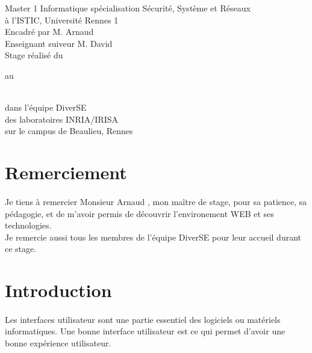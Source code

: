 \documentclass[11pt, a4paper, pdftex]{article}
\begin{document}
    \maketitle
    \thispagestyle{pagedegarde}
    \begin{center}
        \vspace{0.25cm} Master 1 Informatique spécialisation Sécurité, Système et Réseaux \\ à l'ISTIC, Université Rennes 1 \\
        \vspace{0.25cm} Encadré par M. Arnaud  \\
        \vspace{0.25cm} Enseignant suiveur M. David  \\
        \vspace{0.25cm} Stage réalisé du \date{15 mai 2018} au \date{31 août 2018} \\ \vspace{0.25cm} dans l'équipe DiverSE \\ des laboratoires INRIA/IRISA \\ sur le campus de Beaulieu, Rennes
    \end{center}


    \newpage
    \clearpage
    \setcounter{page}{1}
    \pagestyle{document}
    \section*{Remerciement}\label{sec:remerciement}
    \paragraph{}
    Je tiens à remercier Monsieur Arnaud , mon maître de stage, pour sa patience, sa pédagogie, et de m'avoir permis de découvrir l'environement WEB et ses technologies. \\
    Je remercie aussi tous les membres de l'équipe DiverSE pour leur accueil durant ce stage.
    \newpage

    \tableofcontents

    \newpage

    \section{Introduction}\label{sec:introduction}
        \paragraph{}
            Les interfaces utilisateur sont une partie essentiel des logiciels ou matériels informatiques.
            Une bonne interface utilisateur est ce qui permet d'avoir une bonne expérience utilisateur.
\end{document}
